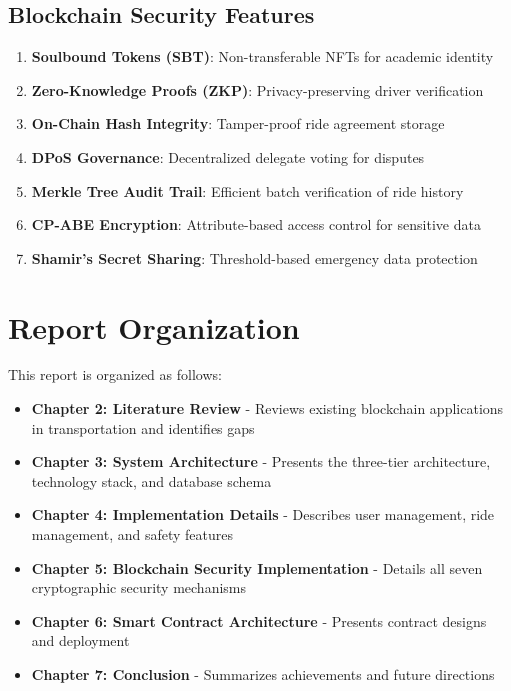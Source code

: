 \documentclass[12pt]{report}
\theoremstyle{plain}
\theoremstyle{definition}
\theoremstyle{remark}
\begin{document}
\subsection{Blockchain Security Features}

\begin{enumerate}
    \item \textbf{Soulbound Tokens (SBT)}: Non-transferable NFTs for academic identity
    \item \textbf{Zero-Knowledge Proofs (ZKP)}: Privacy-preserving driver verification
    \item \textbf{On-Chain Hash Integrity}: Tamper-proof ride agreement storage
    \item \textbf{DPoS Governance}: Decentralized delegate voting for disputes
    \item \textbf{Merkle Tree Audit Trail}: Efficient batch verification of ride history
    \item \textbf{CP-ABE Encryption}: Attribute-based access control for sensitive data
    \item \textbf{Shamir's Secret Sharing}: Threshold-based emergency data protection
\end{enumerate}

\section{Report Organization}

This report is organized as follows:

\begin{itemize}
    \item \textbf{Chapter 2: Literature Review} - Reviews existing blockchain applications in transportation and identifies gaps
    \item \textbf{Chapter 3: System Architecture} - Presents the three-tier architecture, technology stack, and database schema
    \item \textbf{Chapter 4: Implementation Details} - Describes user management, ride management, and safety features
    \item \textbf{Chapter 5: Blockchain Security Implementation} - Details all seven cryptographic security mechanisms
    \item \textbf{Chapter 6: Smart Contract Architecture} - Presents contract designs and deployment
    \item \textbf{Chapter 7: Conclusion} - Summarizes achievements and future directions
\end{itemize}
\end{document}
